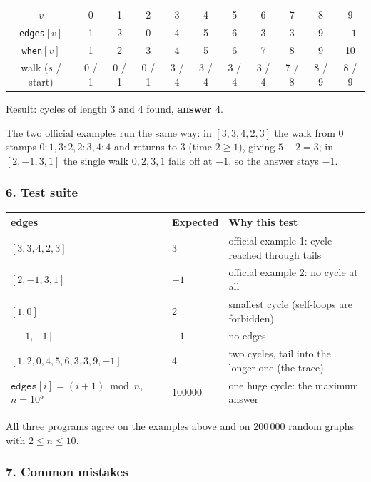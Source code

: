 \begin{tracebox}[{Approach 2 on $[1,2,0,4,5,6,3,3,9,-1]$}]
\medskip
\small
\begin{tabular}{@{}c|cccccccccc@{}}
\toprule
$v$ & 0 & 1 & 2 & 3 & 4 & 5 & 6 & 7 & 8 & 9 \\
\texttt{edges}$[v]$ & 1 & 2 & 0 & 4 & 5 & 6 & 3 & 3 & 9 & $-1$ \\
\texttt{when}$[v]$ & 1 & 2 & 3 & 4 & 5 & 6 & 7 & 8 & 9 & 10 \\
\midrule
walk ($s$ / start) & 0 / 1 & 0 / 1 & 0 / 1 & 3 / 4 & 3 / 4 & 3 / 4 & 3 / 4 & 7 / 8 & 8 / 9 & 8 / 9 \\
\bottomrule
\end{tabular}
\par\smallskip
Result: cycles of length $3$ and $4$ found, \textbf{answer $4$}.
\end{tracebox}

The two official examples run the same way: in $[3,3,4,2,3]$ the walk from $0$ stamps $0{:}1, 3{:}2, 2{:}3, 4{:}4$ and returns to $3$ (time $2 \ge 1$), giving $5 - 2 = 3$; in $[2,-1,3,1]$ the single walk $0,2,3,1$ falls off at $-1$, so the answer stays $-1$.

\subsubsection*{6. Test suite}

\begin{testbox}
\centering\small
\begin{tabular}{@{}lll@{}}
\toprule
\textbf{edges} & \textbf{Expected} & \textbf{Why this test} \\
\midrule
$[3,3,4,2,3]$ & 3 & official example 1: cycle reached through tails \\
$[2,-1,3,1]$ & $-1$ & official example 2: no cycle at all \\
$[1,0]$ & 2 & smallest cycle (self-loops are forbidden) \\
$[-1,-1]$ & $-1$ & no edges \\
$[1,2,0,4,5,6,3,3,9,-1]$ & 4 & two cycles, tail into the longer one (the trace) \\
$\texttt{edges}[i] = (i+1) \bmod n$, $n = 10^5$ & 100000 & one huge cycle: the maximum answer \\
\bottomrule
\end{tabular}
\end{testbox}

All three programs agree on the examples above and on $200\,000$ random graphs with $2 \le n \le 10$.

\subsubsection*{7. Common mistakes}

